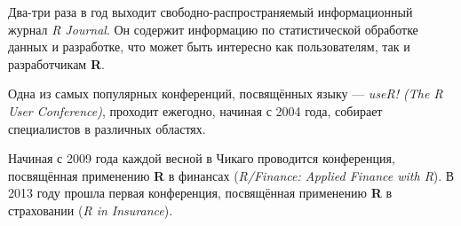 Два-три раза в год выходит свободно-распространяемый информационный журнал \textit{R Journal}. Он содержит информацию по статистической обработке данных и разработке, что может быть интересно как пользователям, так и разработчикам \textbf{R}.

Одна из самых популярных конференций, посвящённых языку --- \textit{useR! (The R User Conference)}, проходит ежегодно, начиная с 2004 года, собирает специалистов в различных областях.

Начиная с 2009 года каждой весной в Чикаго проводится конференция, посвящённая применению \textbf{R} в финансах (\textit{R/Finance: Applied Finance with R}). В 2013 году прошла первая конференция, посвящённая применению \textbf{R} в страховании (\textit{R in Insurance}).